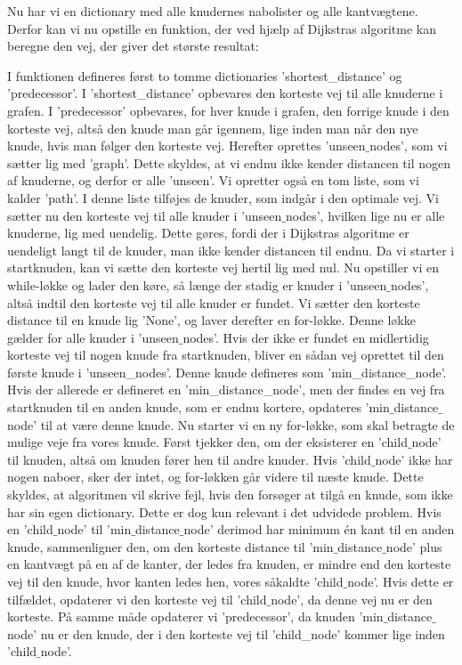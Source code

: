 Nu har vi en dictionary med alle knudernes nabolister og alle kantvægtene. Derfor kan vi nu opstille en funktion, der ved hjælp af Dijkstras algoritme kan beregne den vej, der giver det største resultat:



I funktionen defineres først to tomme dictionaries 'shortest\_distance' og 'predecessor'. I 'shortest\_distance' opbevares den korteste vej til alle knuderne i grafen. I 'predecessor' opbevares, for hver knude i grafen, den forrige knude i den korteste vej, altså den knude man går igennem, lige inden man når den nye knude, hvis man følger den korteste vej. Herefter oprettes 'unseen$\_$nodes', som vi sætter lig med 'graph'. Dette skyldes, at vi endnu ikke kender distancen til nogen af knuderne, og derfor er alle 'unseen'. Vi opretter også en tom liste, som vi kalder 'path'. I denne liste tilføjes de knuder, som indgår i den optimale vej.
Vi sætter nu den korteste vej til alle knuder i 'unseen$\_$nodes', hvilken lige nu er alle knuderne, lig med uendelig. Dette gøres, fordi der i Dijkstras algoritme er uendeligt langt til de knuder, man ikke kender distancen til endnu. Da vi starter i startknuden, kan vi sætte den korteste vej hertil lig med nul.
Nu opstiller vi en while-løkke og lader den køre, så længe der stadig er knuder i 'unseen$\_$nodes', altså indtil den korteste vej til alle knuder er fundet.
Vi sætter den korteste distance til en knude lig 'None', og laver derefter en for-løkke. Denne løkke gælder for alle knuder i 'unseen$\_$nodes'. Hvis der ikke er fundet en midlertidig korteste vej til nogen knude fra startknuden, bliver en sådan vej oprettet til den første knude i 'unseen\_nodes'. Denne knude defineres som 'min\_distance\_node'. Hvis der allerede er defineret en 'min\_distance\_node', men der findes en vej fra startknuden til en anden knude, som er endnu kortere, opdateres 'min$\_$distance$\_$node' til at være denne knude.
Nu starter vi en ny for-løkke, som skal betragte de mulige veje fra vores knude.
Først tjekker den, om der eksisterer en 'child$\_$node' til knuden, altså om knuden fører hen til andre knuder. Hvis 'child$\_$node' ikke har nogen naboer, sker der intet, og for-løkken går videre til næste knude. Dette skyldes, at algoritmen vil skrive fejl, hvis den forsøger at tilgå en knude, som ikke har sin egen dictionary. Dette er dog kun relevant i det udvidede problem.
Hvis en 'child$\_$node' til  'min$\_$distance$\_$node' derimod har minimum én kant til en anden knude, sammenligner den, om den korteste distance til 'min$\_$distance$\_$node' plus en kantvægt på en af de kanter, der ledes fra knuden, er mindre end den korteste vej til den knude, hvor kanten ledes hen, vores såkaldte 'child$\_$node'. Hvis dette er tilfældet, opdaterer vi den korteste vej til 'child$\_$node', da denne vej nu er den korteste. På samme måde opdaterer vi 'predecessor', da knuden 'min$\_$distance$\_$node' nu er den knude, der i den korteste vej til 'child\_node' kommer lige inden 'child$\_$node'.

